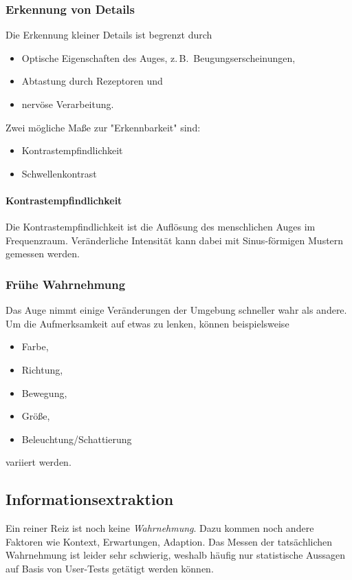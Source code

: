 \documentclass[a4paper, 11pt, accentcolor = tud3b]{tudreport}
\newcommand{\zB}{z.\,B.~}
\begin{document}

				\subsubsection{Erkennung von Details}
					Die Erkennung kleiner Details ist begrenzt durch
					\begin{itemize}
						\item Optische Eigenschaften des Auges, \zB Beugungserscheinungen,
						\item Abtastung durch Rezeptoren und
						\item nervöse Verarbeitung.
					\end{itemize}
					Zwei mögliche Maße zur "Erkennbarkeit" sind:
					\begin{itemize}
						\item Kontrastempfindlichkeit
						\item Schwellenkontrast
					\end{itemize}

					\paragraph{Kontrastempfindlichkeit}
						Die Kontrastempfindlichkeit ist die Auflösung des menschlichen Auges im Frequenzraum. Veränderliche Intensität kann dabei mit Sinus-förmigen Mustern gemessen werden.

				\subsubsection{Frühe Wahrnehmung}
					Das Auge nimmt einige Veränderungen der Umgebung schneller wahr als andere. Um die Aufmerksamkeit auf etwas zu lenken, können beispielsweise
					\begin{itemize}
						\item Farbe,
						\item Richtung,
						\item Bewegung,
						\item Größe,
						\item Beleuchtung/Schattierung
					\end{itemize}
					variiert werden.

			\subsection{Informationsextraktion}
				Ein reiner Reiz ist noch keine \emph{Wahrnehmung}. Dazu kommen noch andere Faktoren wie Kontext, Erwartungen, Adaption. Das Messen der tatsächlichen Wahrnehmung ist leider sehr schwierig, weshalb häufig nur statistische Aussagen auf Basis von User-Tests getätigt werden können.
				
\end{document}
